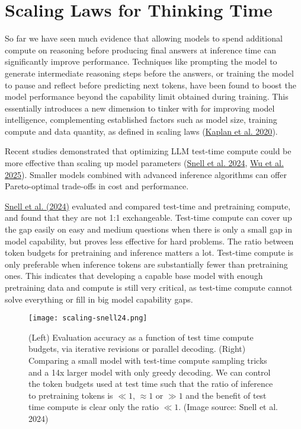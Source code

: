 \documentclass[12pt]{article}
\begin{document}
\section{Scaling Laws for Thinking Time}
So far we have seen much evidence that allowing models to spend additional compute on reasoning before producing final answers at inference time can significantly improve performance. Techniques like prompting the model to generate intermediate reasoning steps before the answers, or training the model to pause and reflect before predicting next tokens, have been found to boost the model performance beyond the capability limit obtained during training. This essentially introduces a new dimension to tinker with for improving model intelligence, complementing established factors such as model size, training compute and data quantity, as defined in scaling laws (\href{https://arxiv.org/abs/2001.08361}{Kaplan et al. 2020}).

Recent studies demonstrated that optimizing LLM test-time compute could be more effective than scaling up model parameters (\href{https://arxiv.org/abs/2408.03314}{Snell et al. 2024}, \href{https://arxiv.org/abs/2408.00724}{Wu et al. 2025}). Smaller models combined with advanced inference algorithms can offer Pareto-optimal trade-offs in cost and performance.

\href{https://arxiv.org/abs/2408.03314}{Snell et al. (2024)} evaluated and compared test-time and pretraining compute, and found that they are not 1:1 exchangeable. Test-time compute can cover up the gap easily on easy and medium questions when there is only a small gap in model capability, but proves less effective for hard problems. The ratio between token budgets for pretraining and inference matters a lot. Test-time compute is only preferable when inference tokens are substantially fewer than pretraining ones. This indicates that developing a capable base model with enough pretraining data and compute is still very critical, as test-time compute cannot solve everything or fill in big model capability gaps.

\begin{figure}[h]
    \centering
    \texttt{[image: scaling-snell24.png]}
    \caption{(Left) Evaluation accuracy as a function of test time compute budgets, via iterative revisions or parallel decoding. (Right) Comparing a small model with test-time compute sampling tricks and a 14x larger model with only greedy decoding. We can control the token budgets used at test time such that the ratio of inference to pretraining tokens is $\ll 1$, $\approx 1$ or $\gg 1$ and the benefit of test time compute is clear only the ratio $\ll 1$. (Image source: Snell et al. 2024)}
\end{figure}
\end{document}
